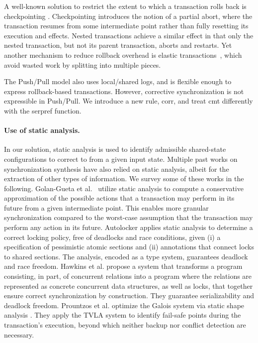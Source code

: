 A well-known solution to restrict the extent to which a transaction rolls back is checkpointing \cite{spaa08a,Egwutuoha:2013}. Checkpointing introduces the notion of a partial abort, where the transaction resumes from some intermediate point rather than fully resetting its execution and effects. Nested transactions \cite{ont,beeri} achieve a similar effect in that only the nested transaction, but not its parent transaction, aborts and restarts. Yet another mechanism to reduce rollback overhead is elastic transactions~\cite{FGG:DISC09}, which avoid wasted work by splitting into multiple pieces.  

The Push/Pull model \cite{KoskinenP15} also uses local/shared logs, and is flexible enough to express rollback-based transactions. However, corrective synchronization is not expressible in Push/Pull. We introduce a new rule, {\sf corr}, and treat {\sf cmt} differently with the {\sf serpref} function.

\paragraph{Use of static analysis.} In our solution, static analysis is used to identify admissible shared-state configurations to correct to from a given input state. Multiple past works on synchronization synthesis have also relied on static analysis, albeit for the extraction of other types of information. We survey some of these works in the following.
%
Golan-Gueta et al.~\cite{GRSY:PLDI13} utilize static analysis to compute a conservative approximation of the possible actions that a transaction may perform in its future from a given intermediate point. This enables more granular synchronization compared to the worst-case assumption that the transaction may perform any action in its future.
%
Autolocker \cite{popl/McCloskeyZGB06} applies static analysis to determine a correct locking policy, free of deadlocks and race conditions, given (i) a specification of pessimistic atomic sections and (ii) annotations that connect locks to shared sections. The analysis, encoded as a type system, guarantees deadlock and race freedom.
%
Hawkins et al. \cite{HawkinsAFRS12} propose a system that transforms a program consisting, in part, of concurrent relations into a program where the relations are represented as concrete concurrent data structures, as well as locks, that together ensure correct synchronization by construction. They guarantee serializability and deadlock freedom.
%
Prountzos et al. \cite{PrountzosMPM11} optimize the Galois system \cite{Galois} via static shape analysis \cite{MoolyToplas}. They apply the TVLA system to identify fail-safe points during the transaction's execution, beyond which neither backup nor conflict detection are necessary. 





